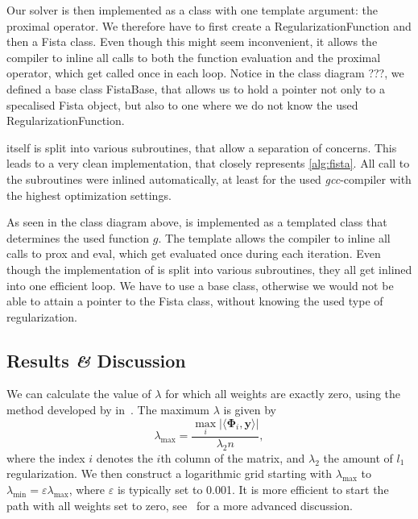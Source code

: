 Our solver \fista is then implemented as a class with one template argument: the
proximal operator.
We therefore have to first create a RegularizationFunction and then a Fista
class.
Even though this might seem inconvenient, it allows the compiler to inline all
calls to both the function evaluation and the proximal operator, which get
called once in each loop.
Notice in the class diagram ???, we defined a base class FistaBase, that allows us to hold a pointer not only to a specalised Fista object, but also to one where we do not know the used RegularizationFunction.

\fista itself is split into various subroutines, that allow a separation of
concerns.
This leads to a very clean implementation, that closely represents
\cref{alg:fista}.
All call to the subroutines were inlined automatically, at least for the used
\emph{gcc}-compiler with the highest optimization settings.


As seen in the class diagram above, \fista is implemented as a templated class
that determines the used function \(g\).
The template allows the compiler to inline all calls to prox and eval, which get
evaluated once during each iteration.
Even though the implementation of \fista is split into various subroutines, they
all get inlined into one efficient loop.
We have to use a base class, otherwise we would not be able to attain a pointer
to the Fista class, without knowing the used type of regularization.
\FloatBarrier{}
\subsection{Results \textit{\&} Discussion}
We can calculate the value of \(\lambda\) for which all weights are exactly
zero, using the method developed by \citeauthor{regularizationpaths} in~\cite{regularizationpaths}.
The maximum \(\lambda\) is given by
\begin{equation*}
  \lambda_{\text{max}} = \frac{\max_i \vert \langle \bm{\Phi}_i, \bm{y} \rangle \vert}{\lambda_2 n},
\end{equation*}
where the index \(i\) denotes the \(i\)th column of the matrix, and
\(\lambda_2\) the amount of \(l_1\) regularization.
We then construct a logarithmic grid starting with \(\lambda_{\text{max}}\) to
\(\lambda_{\text{min}} = \varepsilon \lambda_{\text{max}}\), where
\(\varepsilon\) is typically set to 0.001.
It is more efficient to start the path with all weights set to zero, see~\cite{regularizationpaths} for a more advanced discussion.

